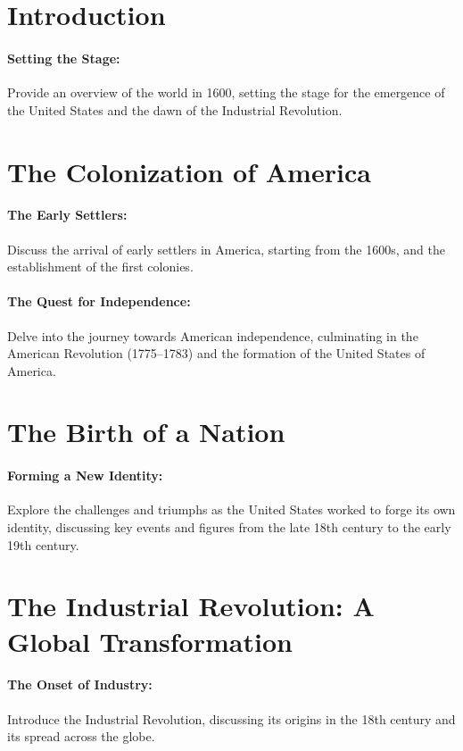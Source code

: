 \documentclass[a4paper,12pt]{book}
\begin{document}
\section*{Introduction}

\paragraph{Setting the Stage:}
Provide an overview of the world in 1600, setting the stage for the emergence of the United States and the dawn of the Industrial Revolution.

\section*{The Colonization of America}

\paragraph{The Early Settlers:}
Discuss the arrival of early settlers in America, starting from the 1600s, and the establishment of the first colonies.

\paragraph{The Quest for Independence:}
Delve into the journey towards American independence, culminating in the American Revolution (1775–1783) and the formation of the United States of America.

\section*{The Birth of a Nation}

\paragraph{Forming a New Identity:}
Explore the challenges and triumphs as the United States worked to forge its own identity, discussing key events and figures from the late 18th century to the early 19th century.

\section*{The Industrial Revolution: A Global Transformation}

\paragraph{The Onset of Industry:}
Introduce the Industrial Revolution, discussing its origins in the 18th century and its spread across the globe.
\end{document}
